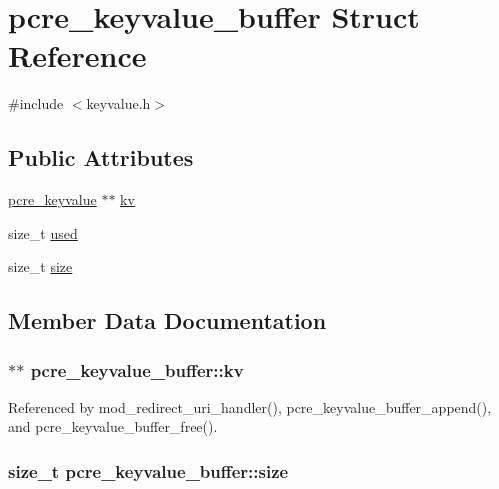 \hypertarget{structpcre__keyvalue__buffer}{\section{pcre\-\_\-keyvalue\-\_\-buffer Struct Reference}
\label{structpcre__keyvalue__buffer}
}


{\ttfamily \#include $<$keyvalue.\-h$>$}

\subsection*{Public Attributes}
\begin{DoxyCompactItemize}
\item 
\hyperlink{structpcre__keyvalue}{pcre\-\_\-keyvalue} $\ast$$\ast$ \hyperlink{structpcre__keyvalue__buffer_a7c140828b76c7aadaedefa51c726795c}{kv}
\item 
size\-\_\-t \hyperlink{structpcre__keyvalue__buffer_a58f9fa332765d989747b300a30f87bac}{used}
\item 
size\-\_\-t \hyperlink{structpcre__keyvalue__buffer_aa5692745721bbe7f203cda72fb11747a}{size}
\end{DoxyCompactItemize}


\subsection{Member Data Documentation}
\hypertarget{structpcre__keyvalue__buffer_a7c140828b76c7aadaedefa51c726795c}{
\subsubsection[{kv}]{$\ast$$\ast$ pcre\-\_\-keyvalue\-\_\-buffer\-::kv}}\label{structpcre__keyvalue__buffer_a7c140828b76c7aadaedefa51c726795c}


Referenced by mod\-\_\-redirect\-\_\-uri\-\_\-handler(), pcre\-\_\-keyvalue\-\_\-buffer\-\_\-append(), and pcre\-\_\-keyvalue\-\_\-buffer\-\_\-free().

\hypertarget{structpcre__keyvalue__buffer_aa5692745721bbe7f203cda72fb11747a}{
\subsubsection[{size}]{\setlength{\rightskip}{0pt plus 5cm}size\-\_\-t pcre\-\_\-keyvalue\-\_\-buffer\-::size}}\label{structpcre__keyvalue__buffer_aa5692745721bbe7f203cda72fb11747a}


